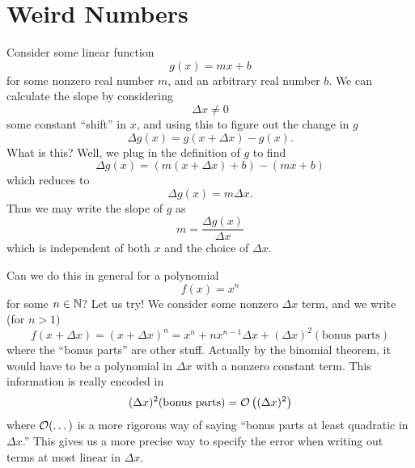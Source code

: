 
\section{Weird Numbers}

Consider some linear function
\begin{equation}
g(x)=mx+b
\end{equation}
for some nonzero real number $m$, and an arbitrary real number
$b$. We can calculate the slope by considering
\begin{equation}
 \Delta x\not=0
\end{equation}
some constant ``shift'' in $x$, and using this to figure out the
change in $g$
\begin{equation}
\Delta g(x)=g(x+\Delta x)-g(x).
\end{equation}
What is this? Well, we plug in the definition of $g$ to find
\begin{equation}
\Delta g(x)=(m(x+\Delta x)+b)-(mx+b)
\end{equation}
which reduces to
\begin{equation}
\Delta g(x)=m\Delta x.
\end{equation}
Thus we may write the slope of $g$ as
\begin{equation}
m=\frac{\Delta g(x)}{\Delta x}
\end{equation}
which is independent of both $x$ and the choice of $\Delta x$.

Can we do this in general for a polynomial
\begin{equation}\label{eq:definitionOfF}
f(x)=x^{n}
\end{equation}
for some $n\in\mathbb{N}$? Let us try! We consider some nonzero $\Delta
x$ term, and we write (for $n>1$)
\begin{equation}
f(x+\Delta x)=(x+\Delta x)^{n}=x^{n}+nx^{n-1}\Delta
x+(\Delta x)^{2}(\mbox{bonus parts})
\end{equation}
where the ``bonus parts'' are other stuff. Actually by the binomial
theorem, it would have to be a polynomial in $\Delta x$ with a
nonzero constant term. This information is really encoded in
\begin{equation}
(\Delta x)^{2}(\mbox{bonus parts})=\mathcal{O}\left((\Delta x)^{2}\right)
\end{equation}
where $\mathcal{O}(\dots)$ is a more rigorous way of saying ``bonus
parts at least quadratic in $\Delta x$.'' This gives us a more
precise way to specify the error when writing out terms at most
linear in $\Delta x$.

